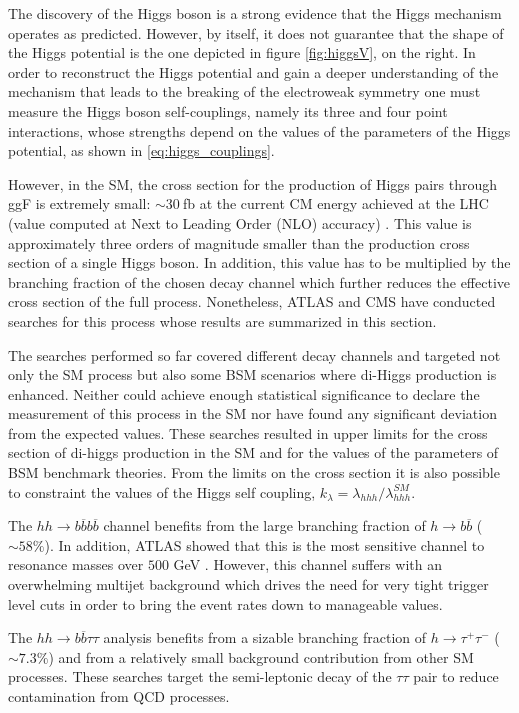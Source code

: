 The discovery of the Higgs boson is a strong evidence that the Higgs mechanism operates as predicted. However, by itself, it does not guarantee that the shape of the Higgs potential is the one depicted in figure \ref{fig:higgsV}, on the right. In order to reconstruct the Higgs potential and gain a deeper understanding of the mechanism that leads to the breaking of the electroweak symmetry one must measure the Higgs boson self-couplings, namely its three and four point interactions, whose strengths depend on the values of the parameters of the Higgs potential, as shown in \ref{eq:higgs_couplings}.  

However, in the SM, the cross section for the production of Higgs pairs through ggF is extremely small: $\sim30~$fb at the current CM energy achieved at the LHC (value computed at Next to Leading Order (NLO) accuracy) \cite{higgsCrossSection}. This value is approximately three orders of magnitude smaller than the production cross section of a single Higgs boson. In addition, this value has to be multiplied by the branching fraction of the chosen decay channel which further reduces the effective cross section of the full process. Nonetheless, ATLAS and CMS have conducted searches for this process whose results are summarized in this section.

The searches performed so far covered different decay channels and targeted not only the SM process but also some BSM scenarios where di-Higgs production is enhanced. Neither could achieve enough statistical significance to declare the measurement of this process in the SM nor have found any significant deviation from the expected values. These searches resulted in upper limits for the cross section of di-higgs production in the SM and for the values of the parameters of BSM benchmark theories. From the limits on the cross section it is also possible to constraint the values of the Higgs self coupling, $k_{\lambda}=\lambda_{hhh}/\lambda_{hhh}^{SM}$.

The $hh\rightarrow b\overline{b}b\overline{b}$ channel \cite{hh2bbbbATLAS,hh2bbbbCMS} benefits from the large branching fraction of $h\rightarrow b\overline{b}$ ($\sim 58 \%$). In addition, ATLAS showed that this is the most sensitive channel to resonance masses over $500$ GeV \cite{hhATLAS}. However, this channel suffers with an overwhelming multijet background which drives the need for very tight trigger level cuts in order to bring the event rates down to manageable values.

The $hh\rightarrow b\overline{b}\tau\tau$ analysis \cite{hhbbtautau_CMS,hhATLAS} benefits from a sizable branching fraction of $h\rightarrow\tau^+\tau^-$ ($\sim 7.3\%$) and from a relatively small background contribution from other SM processes. These searches target the semi-leptonic decay of the $\tau\tau$ pair to reduce contamination from QCD processes.

